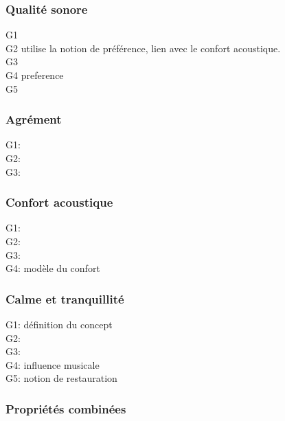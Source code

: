 \subsubsection{Qualité sonore}

G1 \citep{brocolini2012prediction,ricciardi2015sound} \\
G2 \citep{hong2013designing} utilise la notion de préférence, lien avec le confort acoustique.\\
G3 \citep{ozcevik2012laboratory}\\
G4 \citep{yu2010factors} preference\\
G5 \citep{nilsson2006soundscape,nilsson2007acoustic}

\subsubsection{Agrément}

G1: \citep{garcia2012validation} \\
G2: \citep{lavandier2006contribution}\\
G3: \citep{guillen2007importance}

\subsubsection{Confort acoustique}

G1: \citep{yang2005acoustic,meng2013field}\\
G2: \citep{jeon2011non,jeon2013soundwalk}\\
G3: \citep{tse2012perception}\\
G4: \citep{yu2009modeling} modèle du confort

\subsubsection{Calme et tranquillité}

G1: \citep{delaitre2012definition} définition du concept\\
G2: \citep{pheasant2008acoustic,pheasant2009validation}\\
G3: \citep{memoli2008soundscape}\\
G4: \citep{de2006quiet,de2013characterizing} influence musicale\\
G5: \citep{payne2013production} notion de restauration

\subsubsection{Propriétés combinées}

